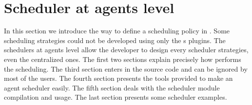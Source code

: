 
\section{Scheduler at agents level}
In this section we introduce the way to define a scheduling policy in \diet.
Some scheduling strategies could not be developed using only the \diet {\sed}s
plugins. The schedulers at agents level allow the developer to design every
scheduler strategies, even the centralized ones. The first two sections
explain precisely how \diet performs the scheduling. The third section enters
in the \diet source code and can be ignored by most of the users. The
fourth section presents the tools provided to make an agent scheduler
easily. The fifth section deals with the scheduler module compilation and
usage. The last section presents some scheduler examples.
